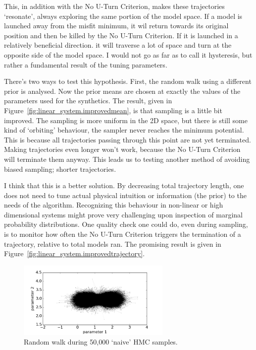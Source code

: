 This, in addition with the No U-Turn Criterion, makes these trajectories `resonate', always exploring the same portion of the model space. If a model is launched away from the misfit minimum, it wil return towards its original position and then be killed by the No U-Turn Criterion. If it is launched in a relatively beneficial direction. it will traverse a lot of space and turn at the opposite side of the model space. I would not go as far as to call it hysteresis, but rather a fundamental result of the tuning parameters.

There's two ways to test this hypothesis. First, the random walk using a different prior is analysed. Now the prior means are chosen at exactly the values of the parameters used for the synthetics. The result, given in Figure~\ref{fig:linear_system.improvedmean}, is that sampling is a little bit improved. The sampling is more uniform in the 2D space, but there is still some kind of `orbiting' behaviour, the sampler never reaches the minimum potential. This is because all trajectories passing through this point are not yet terminated. Making trajectories even longer won't work, because the No U-Turn Criterion will terminate them anyway. This leads us to testing another method of avoiding biased sampling; shorter trajectories.

I think that this is a better solution. By decreasing total trajectory length, one does not need to tune actual physical intuition or information (the prior) to the needs of the algorithm. Recognizing this behaviour in non-linear or high dimensional systems might prove very challenging upon inspection of marginal probability distributions. One quality check one could do, even during sampling, is to monitor how often the No U-Turn Criterion triggers the termination of a trajectory, relative to total models ran. The promising result is given in Figure~\ref{fig:linear_system.improvedtrajectory}.

\begin{figure}
	\centering
	\includegraphics[width=0.66\textwidth]{figures/linear_systems/2d_naive/randomWalk_50000.png}
	\caption{Random walk during 50,000 `naive' \gls{HMC} samples.}
	\label{fig:linear_system.randomWalk50000naive}
\end{figure}

